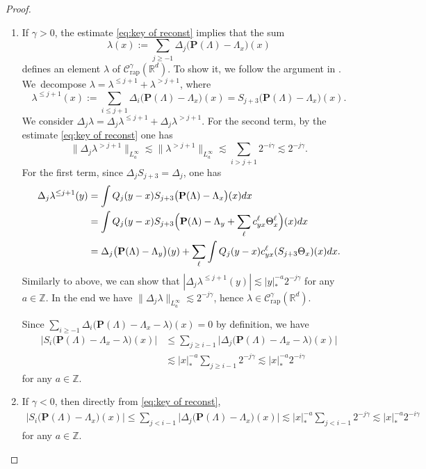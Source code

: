 \documentclass[10pt]{amsart}
\newenvironment{enumeratei}
{\bgroup\def\theenumi{\roman{enumi}}\def\theenumii{\arabic{enumii}}\begin{enumerate}}
{\end{enumerate}\egroup}
\theoremstyle{plain}
\theoremstyle{definition}
\newcommand{\rap}{\mathrm{rap}}
\newcommand{\bfP}{\mathbf{P}}
\newcommand{\bbR}{\mathbb{R}}
\newcommand{\bbZ}{\mathbb{Z}}
\newcommand{\mcC}{\mathcal{C}}
\begin{document}
\begin{proof}
\begin{enumeratei}
\item
If $\gamma>0$, the estimate \eqref{eq:key of reconst} implies that the sum
\[
\lambda(x):=\sum_{j\ge-1}\Delta_j\bigl(\bfP(\Lambda)-\Lambda_x\bigr)(x)
\]
defines an element $\lambda$ of $\mcC_{\rap}^\gamma(\bbR^d)$.
To show it, we follow the argument in \cite[\S6]{GIP}.
We~decompose $\lambda=\lambda^{\le j+1}+\lambda^{>j+1}$, where
\[
\lambda^{\le j+1}(x):=\sum_{i\le j+1}\Delta_i\bigl(\bfP(\Lambda)-\Lambda_x\bigr)(x)
=S_{j+3}\bigl(\bfP(\Lambda)-\Lambda_x\bigr)(x).
\]
We consider $\Delta_j\lambda=\Delta_j\lambda^{\le j+1}+\Delta_j\lambda^{>j+1}$.
For the second term, by the estimate \eqref{eq:key of reconst} one has
\[
\|\Delta_j\lambda^{>j+1}\|_{L_a^\infty}
\lesssim\|\lambda^{>j+1}\|_{L_a^\infty}
\lesssim\sum_{i>j+1}2^{-i\gamma}\lesssim2^{-j\gamma}.
\]
For the first term, since $\Delta_jS_{j+3}=\Delta_j$, one has
\begin{align*}
\Delta_j\lambda^{\le j+1}(y)
&=\int Q_j(y-x)S_{j+3}\bigl(\bfP(\Lambda)-\Lambda_x\bigr)(x)dx\\
&=\int Q_j(y-x)S_{j+3}\Bigl(\bfP(\Lambda)-\Lambda_y+\sum_\ell c_{yx}^\ell\Theta_x^\ell\Bigr)(x)dx\\
&=\Delta_j\bigl(\bfP(\Lambda)-\Lambda_y\bigr)(y)+\sum_\ell\int Q_j(y-x)c_{yx}^\ell (S_{j+3}\Theta_x)(x)dx.
\end{align*}
Similarly to above, we can show that $|\Delta_j\lambda^{\le j+1}(y)|\lesssim|y|_*^{-a}2^{-j\gamma}$ for any $a\in\bbZ$.
In the end we have $\|\Delta_j\lambda\|_{L_a^\infty}\lesssim2^{-j\gamma}$, hence $\lambda\in\mcC_\rap^\gamma(\bbR^d)$.

Since $\sum_{i\ge-1}\Delta_i\bigl(\bfP(\Lambda)-\Lambda_x-\lambda\bigr)(x)=0$ by definition, we have
\begin{align*}
\big| S_i\bigl(\bfP(\Lambda)-\Lambda_x-\lambda\bigr)(x) \big|
&\le\sum_{j\ge i-1}\big| \Delta_j\bigl(\bfP(\Lambda)-\Lambda_x-\lambda\bigr)(x) \big|\\
&\lesssim|x|_*^{-a}\sum_{j\ge i-1}2^{-j\gamma}\lesssim|x|_*^{-a}2^{-i\gamma}
\end{align*}
for any $a\in\bbZ$.

\item
If $\gamma<0$, then directly from \eqref{eq:key of reconst},
\begin{align*}
\big| S_i\bigl(\bfP(\Lambda)-\Lambda_x\bigr)(x) \big|
\le\sum_{j< i-1}\big| \Delta_j\bigl(\bfP(\Lambda)-\Lambda_x\bigr)(x) \big|
\lesssim|x|_*^{-a}\sum_{j< i-1}2^{-j\gamma}\lesssim|x|_*^{-a}2^{-i\gamma}
\end{align*}
for any $a\in\bbZ$.\qedhere
\end{enumeratei}
\end{proof}
\end{document}
